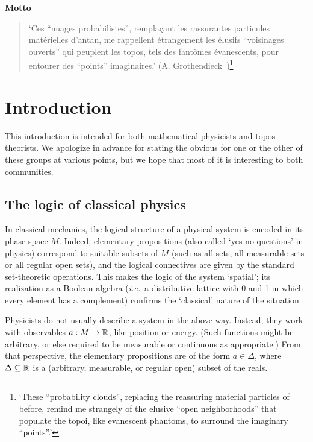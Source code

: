 \documentclass[11pt]{article}
\newcommand{\raw}{\rightarrow} \newcommand{\rat}{\mapsto}
\newcommand{\ie}{\textit{i.e.}}
\begin{document}
\begin{center}\textbf{Motto}
\begin{quote}
  `Ces ``nuages probabilistes'', rempla\c{c}ant les rassurantes
  particules mat{\'e}rielles d'antan, me rappellent {\'e}trangement
  les {\'e}lusifs ``voisinages ouverts'' qui peuplent les topos, tels
  des fant{\^o}mes {\'e}vanescents, pour entourer des ``points''
  imaginaires.'
  (A. Grothendieck~\cite{grothendieck:rs})\footnote{`These
  ``probability clouds'', replacing the reassuring material particles
  of before, remind me strangely of the elusive ``open neighborhoods''
  that populate the topoi, like evanescent phantoms, to surround the
  imaginary ``points''.'}
\end{quote}
\end{center}
\newpage

\section{Introduction}
This introduction is intended for both mathematical physicists and topos theorists. We apologize in advance for
stating the obvious for one or the other of these groups at various points, but we hope that most of it is interesting to both communities.
\subsection{The logic of classical physics}\label{lcp}
In classical mechanics, the logical structure of a physical system is encoded in its phase space $M$.
Indeed, elementary propositions (also called `yes-no questions' in physics) correspond to suitable subsets of $M$
(such as all sets, all measurable sets or all regular open sets),  and the logical connectives
are given by the standard set-theoretic operations. This makes the
logic of the system `spatial'; its realization as a Boolean algebra
(\ie\ a distributive lattice with 0 and 1 in which every element has a
complement) confirms the `classical' nature of the situation \cite{Varadarajan}.

Physicists do not usually describe a system in the above way. Instead, they work with
observables $a:M\raw\R$, like position or energy. (Such functions might be arbitrary, or else required to be measurable or continuous as appropriate.)
 From that perspective, the  elementary propositions  are of the form $a\in \Delta$, where  $\Delta\subseteq {\mathbb R}$ is a (arbitrary, measurable, or regular open) subset of the reals.
\end{document}
